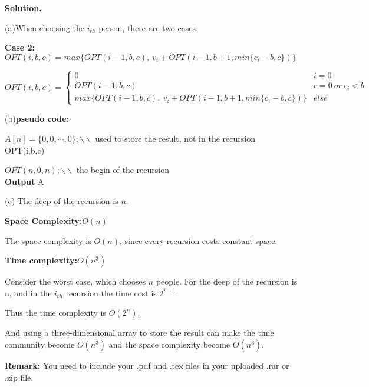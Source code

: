 \documentclass[12pt,a4paper]{article}
\theoremstyle{definition}
\begin{document}
\textbf{Solution.}

(a)When choosing the $i_{th}$ person, there are two cases.


\textbf{Case 2:} $OPT(i,b,c)=max\{ OPT(i-1,b,c),\ v_i+OPT(i-1,b+1,min\{ c_i-b,c\})\}$

\begin{equation}
    OPT(i,b,c)=
   \begin{cases}
   0&i=0\\
   OPT(i-1,b,c)& c=0\ or \ c_i<b\\
   max\{ OPT(i-1,b,c),\ v_i+OPT(i-1,b+1,min\{ c_i-b,c\})\}&else
   \end{cases}
  \end{equation}

  (b)\textbf{pseudo code:}

  \begin{algorithm}[H]
	\BlankLine
	$A[n]=\{ 0,0,\cdots,0\};\backslash \backslash$ used to store the result, not in the recursion\\
	\caption{OPT(i,b,c)}
	\BlankLine
	$OPT(n,0,n);\backslash \backslash$ the begin of the recursion\\
	\textbf{Output} A\;

\end{algorithm}

(c) The deep of the recursion is $n$.

\textbf{Space Complexity:$O(n)$}

The space complexity is $O(n)$, since every recursion costs constant space.

\textbf{Time complexity:$O(n^3)$}

Consider the worst case, which chooses $n$ people. For the deep of the recursion is n, and in the $i_{th}$ recursion the time cost is $2^{i-1}.$

Thus the time complexity is $O(2^n)$.

And using a three-dimensional array to  store the result can make the time community become $O(n^3)$ and the space complexity become $O(n^3)$.
\vspace{20pt}

\textbf{Remark:} You need to include your .pdf and .tex files in your uploaded .rar or .zip file.

\end{document}
